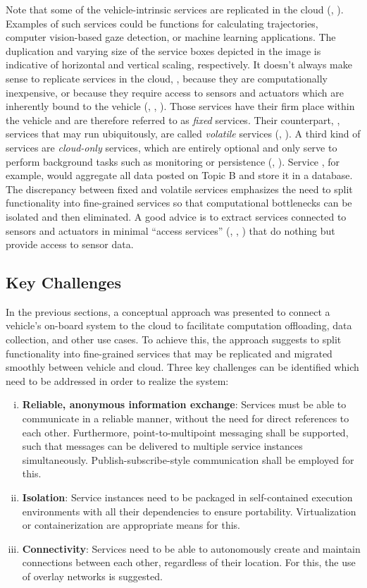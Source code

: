 Note that some of the vehicle-intrinsic services are replicated in the cloud (, ). Examples of such services could be functions for calculating trajectories, computer vision-based gaze detection, or machine learning applications. The duplication and varying size of the service boxes depicted in the image is indicative of horizontal and vertical scaling, respectively. It doesn't always make sense to replicate services in the cloud, \eg , because they are computationally inexpensive, or because they require access to sensors and actuators which are inherently bound to the vehicle (, , ). Those services have their firm place within the vehicle and are therefore referred to as \emph{fixed} services. Their counterpart, \ie , services that may run ubiquitously, are called \emph{volatile} services (, ). A third kind of services are \emph{cloud-only} services, which are entirely optional and only serve to perform background tasks such as monitoring or persistence (, ). Service , for example, would aggregate all data posted on Topic B and store it in a database. The discrepancy between fixed and volatile services emphasizes the need to split functionality into fine-grained services so that computational bottlenecks can be isolated and then eliminated. A good advice is to extract services connected to sensors and actuators in minimal ``access services'' (, , ) that do nothing but provide access to sensor data.
%
%
%
%
%
%
%
%
%
%
\subsection{Key Challenges}
\label{sec:challenges}
In the previous sections, a conceptual approach was presented to connect a vehicle's on-board system to the cloud to facilitate computation offloading, data collection, and other use cases. To achieve this, the approach suggests to split functionality into fine-grained services that may be replicated and migrated smoothly between vehicle and cloud. Three key challenges can be identified which need to be addressed in order to realize the system:

\begin{enumerate}[(i)]
\item \textbf{Reliable, anonymous information exchange}: Services must be able to communicate in a reliable manner, without the need for direct references to each other. Furthermore, point-to-multipoint messaging shall be supported, such that messages can be delivered to multiple service instances simultaneously. Publish-subscribe-style communication shall be employed for this.
\item \textbf{Isolation}: Service instances need to be packaged in self-contained execution environments with all their dependencies to ensure portability. Virtualization or containerization are appropriate means for this.
\item \textbf{Connectivity}: Services need to be able to autonomously create and maintain connections between each other, regardless of their location. For this, the use of overlay networks is suggested.
\end{enumerate}
%
%
%
%
%
%
%
%
%
%
